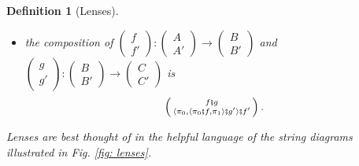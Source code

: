\documentclass[11pt,a4paper,openright,twoside]{report}
\newcounter{mycounter}
\theoremstyle{plain}
\newtheorem{definition}[mycounter]{Definition}
\theoremstyle{definition}
\begin{document}
\begin{definition}[Lenses]
\begin{itemize}
    \item the composition of $\left(\begin{smallmatrix} f \\ f' \end{smallmatrix}\right): \left(\begin{smallmatrix} A \\ A' \end{smallmatrix}\right) \to \left(\begin{smallmatrix} B \\ B' \end{smallmatrix}\right)$ and $\left(\begin{smallmatrix} g \\ g' \end{smallmatrix}\right): \left(\begin{smallmatrix} B \\ B' \end{smallmatrix}\right) \to \left(\begin{smallmatrix} C \\ C' \end{smallmatrix}\right)$ is
    \[\left(\begin{smallmatrix} f \fatsemi g \\ \langle \pi_0, \langle \pi_0 \fatsemi f, \pi_1 \rangle \fatsemi g' \rangle \fatsemi f' \end{smallmatrix}\right).\]
  \end{itemize}
  Lenses are best thought of in the helpful language of the string diagrams illustrated in \textit{Fig. \ref{fig: lenses}}.
\end{definition}
\end{document}
